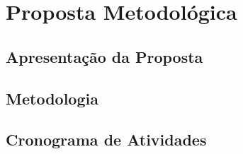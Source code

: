 

\chapter{Proposta Metodológica}
    \label{cha:proposta-metodologica}
    \markright{}            %
    
    \section{Apresentação da Proposta}
        \label{sec:apresentacao-proposta}
    
    \section{Metodologia}
        \label{sec:metodologia-proposta}
    
    \section{Cronograma de Atividades}
        \label{sec:cronograma-atividades}

